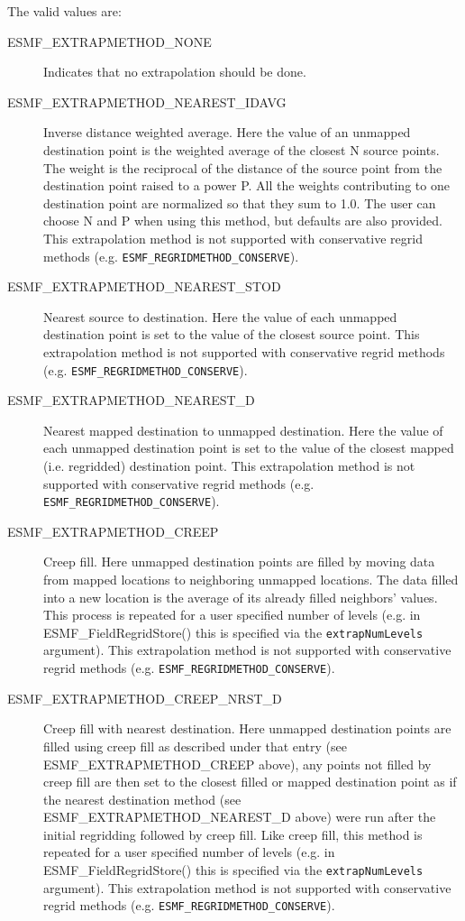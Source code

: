 The valid values are:
\begin{description}
\item [ESMF\_EXTRAPMETHOD\_NONE]
     Indicates that no extrapolation should be done. 
\item [ESMF\_EXTRAPMETHOD\_NEAREST\_IDAVG]
      Inverse distance weighted average. 
      Here the value of an unmapped destination point is the weighted average
      of the closest N source points. The weight is 
      the reciprocal of the distance of the source point from the destination point raised to a power P.
      All the weights contributing to one destination point are normalized so that they sum to 1.0. 
      The user can choose N and P when using this method, but defaults are also provided.  
      This extrapolation method is not supported with conservative regrid methods 
      (e.g. {\tt ESMF\_REGRIDMETHOD\_CONSERVE}).
\item [ESMF\_EXTRAPMETHOD\_NEAREST\_STOD]
      Nearest source to destination. 
      Here the value of each unmapped destination point is set to the value of the closest source point. 
       This extrapolation method is not supported with conservative regrid methods
      (e.g. {\tt ESMF\_REGRIDMETHOD\_CONSERVE}).
\item [ESMF\_EXTRAPMETHOD\_NEAREST\_D]
      Nearest mapped destination to unmapped destination. 
      Here the value of each unmapped destination point is set to the value of the closest mapped (i.e. regridded) destination point. 
      This extrapolation method is not supported with conservative regrid methods
      (e.g. {\tt ESMF\_REGRIDMETHOD\_CONSERVE}).
\item [ESMF\_EXTRAPMETHOD\_CREEP]
      Creep fill.
      Here unmapped destination points are filled by moving data from mapped locations to neighboring unmapped locations. 
      The data filled into a new location is the average of its already filled neighbors' values. 
      This process is repeated for a user specified number of levels (e.g. in ESMF\_FieldRegridStore() this is specified via the {\tt extrapNumLevels} argument).
      This extrapolation method is not supported with conservative regrid methods 
      (e.g. {\tt ESMF\_REGRIDMETHOD\_CONSERVE}).
\item [ESMF\_EXTRAPMETHOD\_CREEP\_NRST\_D]
      Creep fill with nearest destination.
      Here unmapped destination points are filled using creep fill as described under that entry (see ESMF\_EXTRAPMETHOD\_CREEP above), any points not filled
      by creep fill are then set to the closest filled or mapped destination point as if the nearest destination method (see ESMF\_EXTRAPMETHOD\_NEAREST\_D above) 
      were run after the initial regridding followed by creep fill. 
      Like creep fill, this method is repeated for a user specified number of levels 
      (e.g. in ESMF\_FieldRegridStore() this is specified via the {\tt extrapNumLevels} argument).
      This extrapolation method is not supported with conservative regrid methods 
      (e.g. {\tt ESMF\_REGRIDMETHOD\_CONSERVE}).
\end{description}

